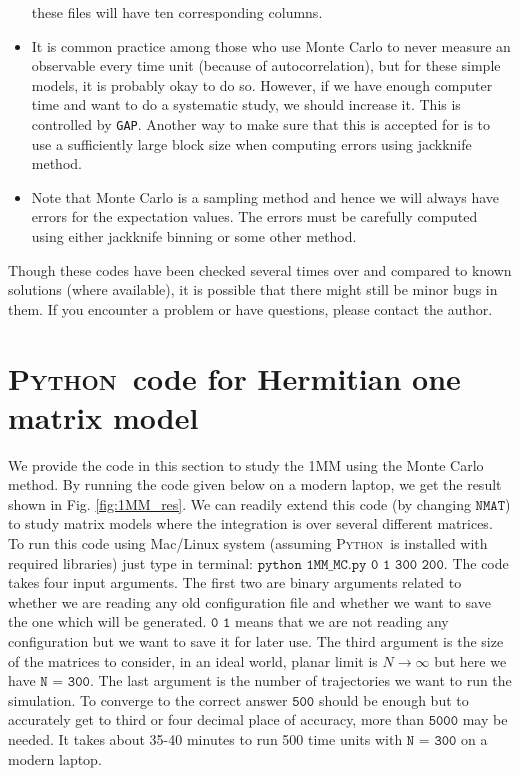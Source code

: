 \documentclass[11pt]{article}
\newcommand{\PY}{\textsc{Python}}
\begin{document}
\begin{itemize}
these files will have ten corresponding columns. 
\item It is common practice among those who use Monte Carlo to never measure an 
observable every time unit (because of autocorrelation), but for these simple models, it is probably okay to do so. However, if we
have enough computer time and want to do a systematic study, we should increase it. This is controlled by \texttt{GAP}. Another way to make sure that this is accepted for is to use a sufficiently large block size when computing errors using jackknife method. 
\item Note that Monte Carlo is a sampling method and hence we will always have errors for the expectation values. The errors must be carefully computed using either jackknife binning or some other method. 
\end{itemize} 
Though these codes have been checked several times over and compared to known solutions (where available), it is possible that there might still be minor bugs in them. If you encounter a problem or have questions, please contact the author. 
\section{\label{sec:1MMPYC}\PY~code for Hermitian one matrix model}
We provide the code in this section to study the 1MM using the Monte Carlo method. By running the code given below
on a modern laptop, we get the result shown in 
Fig. \ref{fig:1MM_res}. We can readily extend this code (by changing $\texttt{NMAT}$) to study matrix models where the integration is over several different matrices. 
To run this code using Mac/Linux system (assuming  \PY~is installed with required libraries) just type in terminal: 
$\texttt{python 1MM\_MC.py 0 1 300 200}$. The code takes four input arguments. The first two are binary arguments
related to whether we are reading any old configuration file and whether we want to save the one which will be 
generated. $\texttt{0 1}$ means that we are not reading any configuration but we want to save it for later use. 
The third argument is the size of the matrices to consider, in an ideal world, planar limit is $ N \to \infty$ but here
we have $\texttt{N = 300}$. The last argument is the 
number of trajectories we want to run the simulation. 
To converge to the correct answer $\texttt{500}$ should be enough but to accurately 
get to third or four decimal place of accuracy, 
more than $\texttt{5000}$ may be needed. 
It takes about 35-40 minutes to run 500 time units 
with $\texttt{N = 300}$ on a modern laptop. 
\begin{footnotesize} 
\begin{mdframed}[backgroundcolor=mauve!3] 

\end{mdframed} 
\end{footnotesize} 
\end{document}
